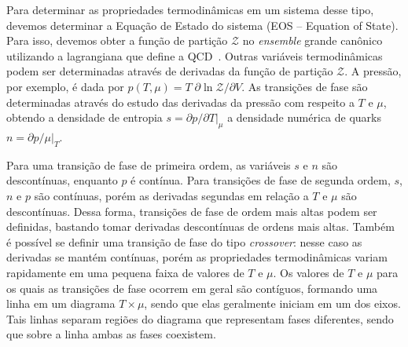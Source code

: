 %

Para determinar as propriedades termodinâmicas em um sistema desse tipo, devemos determinar a Equação de Estado do sistema (EOS -- Equation of State). Para isso, devemos obter a função de partição $\mathcal{Z}$ no \emph{ensemble} grande canônico utilizando a lagrangiana que define a QCD~\cite{Rischke}. Outras variáveis termodinâmicas podem ser determinadas através de derivadas da função de partição $\mathcal{Z}$. A pressão, por exemplo, é dada por $p(T, \mu) = T\;\partial \ln \mathcal{Z} / \partial V$. As transições de fase são determinadas através do estudo das derivadas da pressão com respeito a $T$ e $\mu$, obtendo a densidade de entropia $s = \partial p / \partial T|_\mu$ a densidade numérica de quarks~$n = \partial p / \mu|_T$.

Para uma transição de fase de primeira ordem, as variáveis $s$ e $n$ são descontínuas, enquanto $p$ é contínua. Para transições de fase de segunda ordem, $s$, $n$ e $p$ são contínuas, porém as derivadas segundas em relação a $T$ e $\mu$ são descontínuas. Dessa forma, transições de fase de ordem mais altas podem ser definidas, bastando tomar derivadas descontínuas de ordens mais altas. Também é possível se definir uma transição de fase do tipo \emph{crossover}: nesse caso as derivadas se mantém contínuas, porém as propriedades termodinâmicas variam rapidamente em uma pequena faixa de valores de $T$ e $\mu$. Os valores de $T$ e $\mu$ para os quais as transições de fase ocorrem em geral são contíguos, formando uma linha em um diagrama $T\times\mu$, sendo que elas geralmente iniciam em um dos eixos. Tais linhas separam regiões do diagrama que representam fases diferentes, sendo que sobre a linha ambas as fases coexistem.

